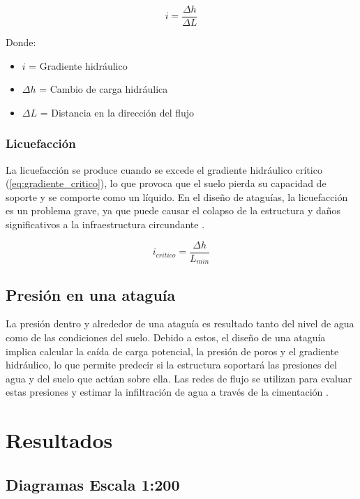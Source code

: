 \begin{equation}
    i = \frac{\Delta h}{\Delta L}
    \label{eq:gradiente_hidraulico}
\end{equation}

Donde:
\begin{itemize}
    \item $i$ = Gradiente hidráulico
    \item $\Delta h$ = Cambio de carga hidráulica
    \item $\Delta L$ = Distancia en la dirección del flujo
\end{itemize}

\subsubsection{Licuefacción}
La licuefacción se produce cuando se excede el gradiente hidráulico crítico (\ref{eq:gradiente_critico}), lo que provoca que el suelo pierda su capacidad de soporte y se comporte como un líquido. En el diseño de ataguías, la licuefacción es un problema grave, ya que puede causar el colapso de la estructura y daños significativos a la infraestructura circundante \citep{budhu_soil_2010}.

\begin{equation}
    i_{critico} = \frac{\Delta h}{L_{min}}
    \label{eq:gradiente_critico}
\end{equation}

\subsection{Presión en una ataguía}
La presión dentro y alrededor de una ataguía es resultado tanto del nivel de agua como de las condiciones del suelo. Debido a estos, el diseño de una ataguía implica calcular la caída de carga potencial, la presión de poros y el gradiente hidráulico, lo que permite predecir si la estructura soportará las presiones del agua y del suelo que actúan sobre ella. Las redes de flujo se utilizan para evaluar estas presiones y estimar la infiltración de agua a través de la cimentación \cite{sivakugan2005}.

\section{Resultados}

\subsection{Diagramas Escala 1:200}

